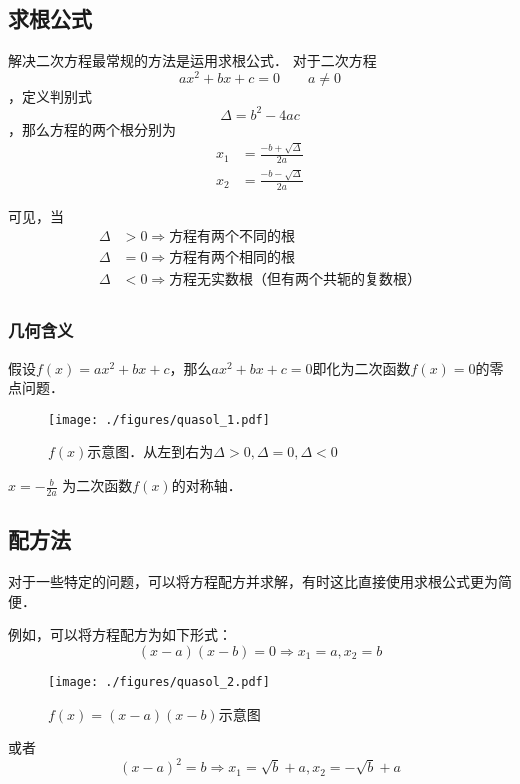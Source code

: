 
\subsection{求根公式}
解决二次方程最常规的方法是运用求根公式．
对于二次方程$$ax^2+bx+c=0 \qquad a\neq 0$$，定义判别式$$\Delta = b^2-4ac$$，那么方程的两个根分别为$$
\begin{aligned}
x_1&=\frac{-b+\sqrt{\Delta}}{2a}\\
x_2&=\frac{-b-\sqrt{\Delta}}{2a}
\end{aligned}
$$

可见，当
$$
\begin{aligned}
\Delta &> 0 \Rightarrow \text{方程有两个不同的根}\\
\Delta &= 0 \Rightarrow \text{方程有两个相同的根}\\
\Delta &< 0 \Rightarrow \text{方程无实数根（但有两个共轭的复数根）}\\
\end{aligned}
$$

\subsubsection{几何含义}
假设$f(x)=ax^2+bx+c$，那么$ax^2+bx+c=0$即化为二次函数$f(x)=0$的零点问题．
\begin{figure}[ht]
\centering
\texttt{[image: ./figures/quasol\_1.pdf]}
\caption{$f(x)$示意图．从左到右为$\Delta > 0, \Delta = 0, \Delta < 0$} \label{quasol_fig1}
\end{figure}
$x=-\frac{b}{2a}$ 为二次函数$f(x)$的对称轴．

\subsection{配方法}
对于一些特定的问题，可以将方程配方并求解，有时这比直接使用求根公式更为简便．

例如，可以将方程配方为如下形式：
$$(x-a)(x-b)=0\Rightarrow x_1=a, x_2=b$$
\begin{figure}[ht]
\centering
\texttt{[image: ./figures/quasol\_2.pdf]}
\caption{$f(x)=(x-a)(x-b)$示意图} \label{quasol_fig2}
\end{figure}

或者
$$(x-a)^2=b\Rightarrow x_1=\sqrt{b}+a, x_2=-\sqrt{b}+a$$

